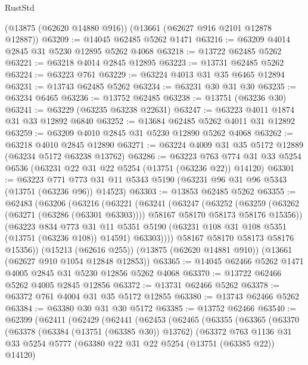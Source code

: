 \begin{lexlean}{RustStd}
\begin{coremodule}
    (@13875 (@62620 @14880 @916))
    (@13661 (@62627 @916 @2101 @12878 @12887))
@63209 := @14045 @62485 @5262 @1471
@63216 := @63209 @4014 @2845 @31 @5230 @12895 @5262 @4068
@63218 := @13722 @62485 @5262
@63221 := @63218 @4014 @2845 @12895
@63223 := @13731 @62485 @5262
@63224 := @63223 @761
@63229 := @63224 @4013 @31 @35 @6465 @12894
@63231 := @13743 @62485 @5262
@63234 := @63231 @30 @31 @30
@63235 := @63234 @6465
@63236 := @13752 @62485
@63238 := @13751 (@63236 @30)
@63241 := @63229 (@63235 @63238 @22631)
@63247 := @63223 @4011 @1874 @31 @33 @12892 @6840
@63252 := @13684 @62485 @5262 @4011 @31 @12892
@63259 := @63209 @4010 @2845 @31 @5230 @12890 @5262 @4068
@63262 := @63218 @4010 @2845 @12890
@63271 := @63224 @4009 @31 @35 @5172 @12889 (@63234 @5172 @63238 @13762)
@63286 := @63223
    @763
    @774
    @31
    @33
    @5254
    @6536
    (@63231 @22 @31 @22 @5254 (@13751 (@63236 @22)) @14120)
@63301 := @63223
    @771
    @773
    @31
    @11
    @5343
    @5190
    (@63231 @96 @31 @96 @5343 (@13751 (@63236 @96)) @14523)
@63303 := @13853 @62485 @5262
@63355 := @62483
    (@63206
      (@63216
        (@63221
          (@63241
            (@63247
              (@63252
                (@63259
                  (@63262 (@63271 (@63286 (@63301 @63303))))
                  @58167
                  @58170
                  @58173
                  @58176
                  @15356))
              (@63223
                @834
                @773
                @31
                @11
                @5351
                @5190
                (@63231 @108 @31 @108 @5351 (@13751 (@63236 @108)) @14591)
                @63303))))
        @58167
        @58170
        @58173
        @58176
        @15356))
    (@15213 (@62616 @255))
    (@13875 (@62620 @14881 @910))
    (@13661 (@62627 @910 @1054 @12848 @12853))
@63365 := @14045 @62466 @5262 @1471 @4005 @2845 @31 @5230 @12856 @5262 @4068
@63370 := @13722 @62466 @5262 @4005 @2845 @12856
@63372 := @13731 @62466 @5262
@63378 := @63372 @761 @4004 @31 @35 @5172 @12855
@63380 := @13743 @62466 @5262
@63384 := @63380 @30 @31 @30 @5172
@63385 := @13752 @62466
@63540 := @62399
    (@62411
      (@62429
        (@62441
          (@62453
            (@62465
              (@63355
                (@63365
                  (@63370
                    (@63378
                      (@63384 (@13751 (@63385 @30)) @13762)
                      (@63372
                        @763
                        @1136
                        @31
                        @33
                        @5254
                        @5777
                        (@63380 @22 @31 @22 @5254 (@13751 (@63385 @22)) @14120)

\end{coremodule}
\end{lexlean}
